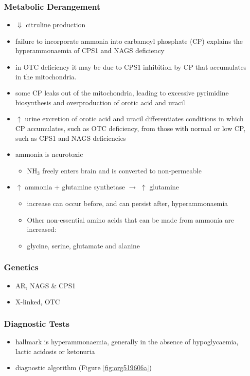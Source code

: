 \documentclass{scrartcl}
\begin{document}
\subsubsection{Metabolic Derangement}
\label{sec:org17f48aa}
\begin{itemize}
\item \(\Downarrow\) citruline production
\item failure to incorporate ammonia into carbamoyl phosphate (CP)
explains the hyperammonaemia of CPS1 and NAGS deficiency
\item in OTC deficiency it may be due to CPS1 inhibition by CP
that accumulates in the mitochondria.
\item some CP leaks out of the mitochondria, leading to excessive
pyrimidine biosynthesis and overproduction of orotic acid and
uracil
\item \(\uparrow\) urine excretion of orotic acid and uracil differentiates
conditions in which CP accumulates, such as OTC deficiency, from
those with normal or low CP, such as CPS1 and NAGS deficiencies
\item ammonia is neurotoxic
\begin{itemize}
\item NH\(_{\text{3}}\) freely enters brain and is converted to non-permeable
\end{itemize}
\item \(\uparrow\) ammonia + glutamine synthetase \(\to\) \(\uparrow\) glutamine
\begin{itemize}
\item increase can occur before, and can persist after, hyperammonaemia
\item Other non-essential amino acids that can be made from ammonia are increased:
\item glycine, serine, glutamate and alanine
\end{itemize}
\end{itemize}

\subsubsection{Genetics}
\label{sec:org2fc4c82}
\begin{itemize}
\item AR, NAGS \& CPS1
\item X-linked, OTC
\end{itemize}

\subsubsection{Diagnostic Tests}
\label{sec:org9c9e406}
\begin{itemize}
\item hallmark is hyperammonaemia, generally in the absence of
hypoglycaemia, lactic acidosis or ketonuria
\item diagnostic algorithm (Figure \ref{fig:org519606a})
\end{itemize}
\end{document}
